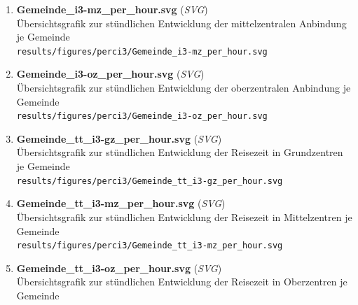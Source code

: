 \begin{enumerate}[label=A\arabic*, ref=A\arabic*, leftmargin=*, itemsep=0.5em, topsep=0.3em]
\begin{enumerate}[label=A\arabic{enumi}-\arabic*, ref=A\arabic{enumi}-\arabic*, leftmargin=*, itemsep=0.5em, topsep=0.3em]
\begin{enumerate}[label=A\arabic{enumi}-\arabic{enumii}-\arabic*, ref=A\arabic{enumi}-\arabic{enumii}-\arabic*, leftmargin=*, itemsep=0.5em, topsep=0.3em]
\begin{enumerate}[label=A\arabic{enumi}-\arabic{enumii}-\arabic{enumiii}-\arabic*, ref=A\arabic{enumi}-\arabic{enumii}-\arabic{enumiii}-\arabic*, leftmargin=*, itemsep=0.5em, topsep=0.3em]
Übersichtsgrafik zur stündlichen Entwicklung der grundzentralen Anbindung je Gemeinde\\
\texttt{\small results/figures/perci3/Gemeinde\_i3-gz\_per\_hour.svg}
\edef\appendixlabelkey{app:A\arabic{enumi}-\arabic{enumii}-\arabic{enumiii}-\arabic{enumiv}}
\expandafter\label\expandafter{\appendixlabelkey}
\item \textbf{Gemeinde\_i3-mz\_per\_hour.svg} \textnormal{(\textit{SVG})}\\
Übersichtsgrafik zur stündlichen Entwicklung der mittelzentralen Anbindung je Gemeinde\\
\texttt{\small results/figures/perci3/Gemeinde\_i3-mz\_per\_hour.svg}
\edef\appendixlabelkey{app:A\arabic{enumi}-\arabic{enumii}-\arabic{enumiii}-\arabic{enumiv}}
\expandafter\label\expandafter{\appendixlabelkey}
\item \textbf{Gemeinde\_i3-oz\_per\_hour.svg} \textnormal{(\textit{SVG})}\\
Übersichtsgrafik zur stündlichen Entwicklung der oberzentralen Anbindung je Gemeinde\\
\texttt{\small results/figures/perci3/Gemeinde\_i3-oz\_per\_hour.svg}
\edef\appendixlabelkey{app:A\arabic{enumi}-\arabic{enumii}-\arabic{enumiii}-\arabic{enumiv}}
\expandafter\label\expandafter{\appendixlabelkey}
\item \textbf{Gemeinde\_tt\_i3-gz\_per\_hour.svg} \textnormal{(\textit{SVG})}\\
Übersichtsgrafik zur stündlichen Entwicklung der Reisezeit in Grundzentren je Gemeinde\\
\texttt{\small results/figures/perci3/Gemeinde\_tt\_i3-gz\_per\_hour.svg}
\edef\appendixlabelkey{app:A\arabic{enumi}-\arabic{enumii}-\arabic{enumiii}-\arabic{enumiv}}
\expandafter\label\expandafter{\appendixlabelkey}
\item \textbf{Gemeinde\_tt\_i3-mz\_per\_hour.svg} \textnormal{(\textit{SVG})}\\
Übersichtsgrafik zur stündlichen Entwicklung der Reisezeit in Mittelzentren je Gemeinde\\
\texttt{\small results/figures/perci3/Gemeinde\_tt\_i3-mz\_per\_hour.svg}
\edef\appendixlabelkey{app:A\arabic{enumi}-\arabic{enumii}-\arabic{enumiii}-\arabic{enumiv}}
\expandafter\label\expandafter{\appendixlabelkey}
\item \textbf{Gemeinde\_tt\_i3-oz\_per\_hour.svg} \textnormal{(\textit{SVG})}\\
Übersichtsgrafik zur stündlichen Entwicklung der Reisezeit in Oberzentren je Gemeinde\\

\end{enumerate}
\end{enumerate}
\end{enumerate}
\end{enumerate}
